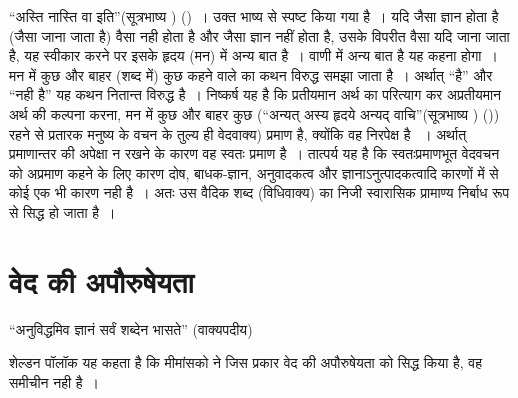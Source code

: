 \newpage

“अस्ति नास्ति वा इति”(सूत्रभाष्य ) ()~। उक्त भाष्य से स्पष्ट किया गया है~। यदि जैसा ज्ञान होता है (जैसा जाना जाता है) वैसा नही होता है और जैसा ज्ञान नहीं होता है, उसके विपरीत वैसा यदि जाना जाता है, यह स्वीकार करने पर इसके हृदय (मन) में अन्य बात है~। वाणी में अन्य बात है यह कहना होगा~। मन में कुछ और बाहर (शब्द में) कुछ कहने वाले का कथन विरुद्ध समझा जाता है~। अर्थात् “है” और “नही है” यह कथन नितान्त विरुद्ध है~। निष्कर्ष यह है कि प्रतीयमान अर्थ का परित्याग कर अप्रतीयमान अर्थ की कल्पना करना, मन में कुछ और बाहर कुछ (“अन्यत् अस्य हृदये अन्यद् वाचि”(सूत्रभाष्य ) ()) रहने से प्रतारक मनुष्य के वचन के तुल्य ही वेदवाक्य) प्रमाण है, क्योंकि वह निरपेक्ष है ~। अर्थात् प्रमाणान्तर की अपेक्षा न रखने के कारण वह स्वतः प्रमाण है~। तात्पर्य यह है कि स्वतःप्रमाणभूत वेदवचन को अप्रमाण कहने के लिए कारण दोष, बाधक-ज्ञान, अनुवादकत्व और ज्ञानाऽनुत्पादकत्वादि कारणों में से कोई एक भी कारण नही है~। अतः उस वैदिक शब्द (विधिवाक्य) का निजी स्वारासिक प्रामाण्य निर्बाध रूप से सिद्ध हो जाता है~।\\[-.95cm]

\section*{वेद की अपौरुषेयता}

“अनुविद्धमिव ज्ञानं सर्वं शब्देन भासते” (वाक्यपदीय)

शेल्डन पॉलॉक यह कहता है कि मीमांसको ने जिस प्रकार वेद की अपौरुषेयता को सिद्ध किया है, वह समीचीन नही है~।

\begin{myquote}

~\hfill {}
\end{myquote}

